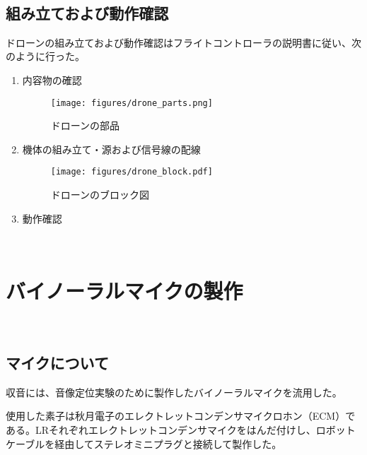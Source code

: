 \
\subsection{組み立ておよび動作確認}\label{assembly-drone}

ドローンの組み立ておよび動作確認はフライトコントローラの説明書\cite{quadrino_nano_instruction:online}に従い、次のように行った。

\begin{enumerate}
\renewcommand{\labelenumi}{(\arabic{enumi})}
\item
  内容物の確認

  \begin{figure}[H]
  \centering
  \texttt{[image: figures/drone\_parts.png]}
  \caption{ドローンの部品}
  \label{fig:drone_parts}
  \end{figure}
\item
  機体の組み立て・源および信号線の配線
  \begin{figure}[H]
  \centering
  \texttt{[image: figures/drone\_block.pdf]}
  \caption{ドローンのブロック図}
  \label{fig:drone_parts}
  \end{figure}
\item
  動作確認
\end{enumerate}

\
\section{バイノーラルマイクの製作}\label{binaural-mic}

\
\subsection{マイクについて}\label{about-mic}

収音には、音像定位実験のために製作したバイノーラルマイクを流用した。

使用した素子は秋月電子のエレクトレットコンデンサマイクロホン（ECM）である。LRそれぞれエレクトレットコンデンサマイクをはんだ付けし、ロボットケーブルを経由してステレオミニプラグと接続して製作した。


